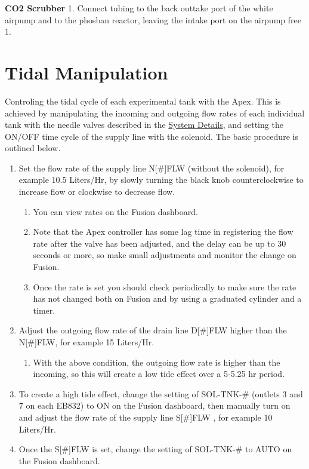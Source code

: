 \documentclass[]{book}
\providecommand{\tightlist}{%
  \setlength{\itemsep}{0pt}\setlength{\parskip}{0pt}}
\begin{document}
 \textbf{CO2 Scrubber} 1. Connect tubing to the back outtake port of the
white airpump and to the phosban reactor, leaving the intake port on the
airpump free 1.

\chapter{Tidal Manipulation}\label{tidal-manipulation}

Controling the tidal cycle of each experimental tank with the Apex. This
is achieved by manipulating the incoming and outgoing flow rates of each
individual tank with the needle valves described in the
\protect\hyperlink{system-details}{System Details}, and setting the
ON/OFF time cycle of the supply line with the solenoid. The basic
procedure is outlined below.

\begin{enumerate}
\def\labelenumi{\arabic{enumi}.}
\tightlist
\item
  Set the flow rate of the supply line N{[}\#{]}FLW (without the
  solenoid), for example 10.5 Liters/Hr, by slowly turning the black
  knob counterclockwise to increase flow or clockwise to decrease flow.

  \begin{enumerate}
  \def\labelenumii{\arabic{enumii}.}
  \tightlist
  \item
    You can view rates on the Fusion dashboard.
  \item
    Note that the Apex controller has some lag time in registering the
    flow rate after the valve has been adjusted, and the delay can be up
    to 30 seconds or more, so make small adjustments and monitor the
    change on Fusion.
  \item
    Once the rate is set you should check periodically to make sure the
    rate has not changed both on Fusion and by using a graduated
    cylinder and a timer.
  \end{enumerate}
\item
  Adjust the outgoing flow rate of the drain line D{[}\#{]}FLW higher
  than the N{[}\#{]}FLW, for example 15 Liters/Hr.

  \begin{enumerate}
  \def\labelenumii{\arabic{enumii}.}
  \tightlist
  \item
    With the above condition, the outgoing flow rate is higher than the
    incoming, so this will create a low tide effect over a 5-5.25 hr
    period.
  \end{enumerate}
\item
  To create a high tide effect, change the setting of SOL-TNK-\#
  (outlets 3 and 7 on each EB832) to ON on the Fusion dashboard, then
  manually turn on and adjust the flow rate of the supply line
  S{[}\#{]}FLW , for example 10 Liters/Hr.\\
\item
  Once the S{[}\#{]}FLW is set, change the setting of SOL-TNK-\# to AUTO
  on the Fusion dashboard.


\end{enumerate}
\end{document}
